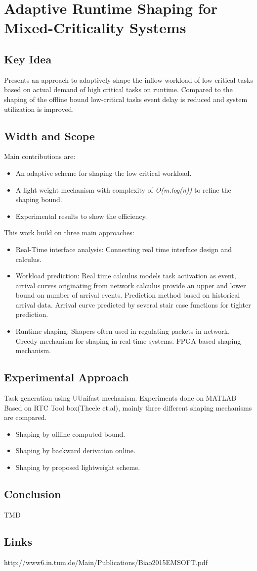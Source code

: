 \section{Adaptive Runtime Shaping for Mixed-Criticality Systems}
\subsection{Key Idea}
Presents an approach to adaptively shape the inflow workload of low-critical tasks based on actual demand of high critical tasks on runtime. Compared to the shaping of the offline bound low-critical tasks event delay is reduced and system utilization is improved.
\subsection{Width and Scope}
Main contributions are:
\begin{itemize}
	 \setlength{\itemsep}{0pt}
	 \setlength{\parskip}{0pt}
	 \setlength{\parsep}{0pt} 
	\item An adaptive scheme for shaping the low critical workload.
	\item A light weight mechanism with complexity of \textit{O(m.log(n))} to refine the shaping bound.
	\item Experimental results to show the efficiency.
\end{itemize}
This work build on three main approaches:
\begin{itemize}
	\item Real-Time interface analysis: Connecting real time interface design and calculus.
	\item Workload prediction: Real time calculus models task activation as event, arrival curves originating from network calculus provide an upper and lower bound on number of arrival events. Prediction method based on historical arrival data. Arrival curve predicted by several stair case functions for tighter prediction.
	\item Runtime shaping: Shapers often used in regulating packets in network. Greedy mechanism for shaping in real time systems. FPGA based shaping mechanism.
\end{itemize}

\subsection{Experimental Approach}
Task generation using UUnifast mechanism.
Experiments done on MATLAB Based on RTC Tool box(Theele et.al), mainly three different shaping mechanisms are compared.
\begin{itemize}
	\setlength{\itemsep}{0pt}
	\setlength{\parskip}{0pt}
	\setlength{\parsep}{0pt} 
	\item Shaping by offline computed bound.
	\item Shaping by backward derivation online.
	\item Shaping by proposed lightweight scheme.
\end{itemize}
\subsection{Conclusion}
TMD
\subsection{Links}
http://www6.in.tum.de/Main/Publications/Biao2015EMSOFT.pdf
